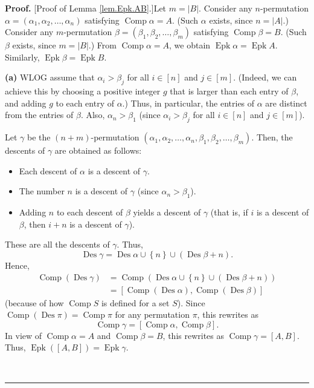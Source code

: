\documentclass[numbers=enddot,12pt,final,onecolumn,notitlepage]{scrartcl}%
\theoremstyle{definition}
\newenvironment{proof}[1][Proof]{\noindent\textbf{#1.} }{\ \rule{0.5em}{0.5em}}
\begin{document}
\begin{proof}
[Proof of Lemma \ref{lem.Epk.AB}.]Let $m=\left\vert B\right\vert $. Consider
any $n$-permutation $\alpha=\left(  \alpha_{1},\alpha_{2},\ldots,\alpha
_{n}\right)  $ satisfying $\operatorname*{Comp}\alpha=A$. (Such $\alpha$
exists, since $n=\left\vert A\right\vert $.) Consider any $m$-permutation
$\beta=\left(  \beta_{1},\beta_{2},\ldots,\beta_{m}\right)  $ satisfying
$\operatorname*{Comp}\beta=B$. (Such $\beta$ exists, since $m=\left\vert
B\right\vert $.) From $\operatorname*{Comp}\alpha=A$, we obtain
$\operatorname*{Epk}\alpha=\operatorname*{Epk}A$. Similarly,
$\operatorname*{Epk}\beta=\operatorname*{Epk}B$.

\textbf{(a)} WLOG assume that $\alpha_{i}>\beta_{j}$ for all $i\in\left[
n\right]  $ and $j\in\left[  m\right]  $. (Indeed, we can achieve this by
choosing a positive integer $g$ that is larger than each entry of $\beta$, and
adding $g$ to each entry of $\alpha$.) Thus, in particular, the entries of
$\alpha$ are distinct from the entries of $\beta$. Also, $\alpha_{n}>\beta
_{1}$ (since $\alpha_{i}>\beta_{j}$ for all $i\in\left[  n\right]  $ and
$j\in\left[  m\right]  $).

Let $\gamma$ be the $\left(  n+m\right)  $-permutation $\left(  \alpha
_{1},\alpha_{2},\ldots,\alpha_{n},\beta_{1},\beta_{2},\ldots,\beta_{m}\right)
$. Then, the descents of $\gamma$ are obtained as follows:

\begin{itemize}
\item Each descent of $\alpha$ is a descent of $\gamma$.

\item The number $n$ is a descent of $\gamma$ (since $\alpha_{n}>\beta_{1}$).

\item Adding $n$ to each descent of $\beta$ yields a descent of $\gamma$ (that
is, if $i$ is a descent of $\beta$, then $i+n$ is a descent of $\gamma$).
\end{itemize}

These are all the descents of $\gamma$. Thus,%
\[
\operatorname*{Des}\gamma=\operatorname*{Des}\alpha\cup\left\{  n\right\}
\cup\left(  \operatorname*{Des}\beta+n\right)  .
\]
Hence,%
\begin{align*}
\operatorname*{Comp}\left(  \operatorname*{Des}\gamma\right)   &
=\operatorname*{Comp}\left(  \operatorname*{Des}\alpha\cup\left\{  n\right\}
\cup\left(  \operatorname*{Des}\beta+n\right)  \right) \\
&  =\left[  \operatorname*{Comp}\left(  \operatorname*{Des}\alpha\right)
,\operatorname*{Comp}\left(  \operatorname*{Des}\beta\right)  \right]
\end{align*}
(because of how $\operatorname*{Comp}S$ is defined for a set $S$). Since
$\operatorname*{Comp}\left(  \operatorname*{Des}\pi\right)
=\operatorname*{Comp}\pi$ for any permutation $\pi$, this rewrites as%
\[
\operatorname*{Comp}\gamma=\left[  \operatorname*{Comp}\alpha
,\operatorname*{Comp}\beta\right]  .
\]
In view of $\operatorname*{Comp}\alpha=A$ and $\operatorname*{Comp}\beta=B$,
this rewrites as $\operatorname*{Comp}\gamma=\left[  A,B\right]  $. Thus,
$\operatorname*{Epk}\left(  \left[  A,B\right]  \right)  =\operatorname*{Epk}%
\gamma$.


\end{proof}
\end{document}
